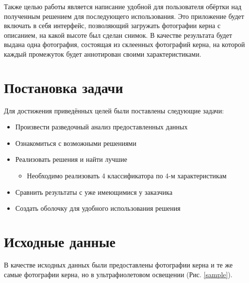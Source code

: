 \documentclass[14pt]{matmex-diploma}
\begin{document}
    Также целью работы является написание удобной для пользователя обёртки над полученным решением для последующего использования. Это приложение будет включать в себя интерфейс, позволяющий загружать фотографии керна с описанием, на какой высоте был сделан снимок. В качестве результата будет выдана одна фотография, состоящая из склеенных фотографий керна, на которой каждый промежуток будет аннотирован своими характеристиками.


\section{Постановка задачи}

    Для достижения приведённых целей были поставлены следующие задачи:
    
    \begin{itemize}
        \item Произвести разведочный анализ предоставленных данных
        \item Ознакомиться с возможными решениями
        \item Реализовать решения и найти лучшие
            \begin{itemize}
                \item Необходимо реализовать 4 классификатора по 4-м характеристикам
            \end{itemize} 
        \item Сравнить результаты с уже имеющимися у заказчика
        \item Создать оболочку для удобного использования решения
    \end{itemize}    
    

\section{Исходные данные}

    В качестве исходных данных были предоставлены фотографии керна и те же самые фотографии керна, но в ультрафиолетовом освещении (Рис. \ref{sample}).
    
\end{document}
